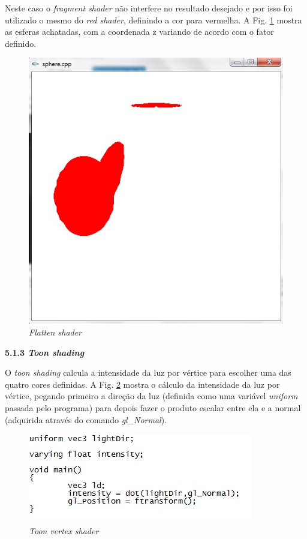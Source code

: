 \begin{description}
	Neste caso o \textit{fragment shader} não interfere no resultado desejado e por isso foi utilizado o mesmo do \textit{red shader}, definindo a cor para vermelha. A Fig. \ref{flatten_shader} mostra as esferas achatadas, com a coordenada z variando de acordo com o fator definido. 

	\begin{figure}[h]
	\centering
		\includegraphics[keepaspectratio=true,scale=0.8]{figuras/flatten_shader.jpg}
	\caption{\textit{Flatten shader}}
	\label{flatten_shader}
	\end{figure}

	\item \textbf{5.1.3 \textit{Toon shading}}

	O  \textit{toon shading} calcula a intensidade da luz por vértice para escolher uma das quatro cores definidas. A Fig. \ref{toon_vs} mostra o cálculo da intensidade da luz por vértice, pegando primeiro a direção da luz (definida como uma variável \textit{uniform} passada pelo programa) para depois fazer o produto escalar entre ela e a normal (adquirida através do comando \textit{gl\_Normal}).  

	\begin{figure}[h]
	\centering
		\includegraphics[keepaspectratio=true,scale=0.8]{figuras/toon_vs.jpg}
	\caption{\textit{Toon vertex shader}}
	\label{toon_vs}
	\end{figure}


\end{description}
